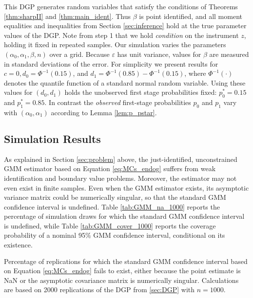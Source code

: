 This DGP generates random variables that satisfy the conditions of Theorems \ref{thm:sharpII} and \ref{thm:main_ident}.
Thus $\beta$ is point identified, and all moment equalities and inequalities from Section \ref{sec:inference} hold at the true parameter values of the DGP.
Note from step 1 that we hold \emph{condition} on the instrument $z$, holding it fixed in repeated samples.
Our simulation varies the parameters $(\alpha_0, \alpha_1, \beta, n)$ over a grid.
Because $\varepsilon$ has unit variance, values for $\beta$ are measured in standard deviations of the error.
For simplicity we present results for $c = 0, d_0 = \Phi^{-1}(0.15)$, and  $d_1= \Phi^{-1}(0.85) - \Phi^{-1}(0.15)$, where $\Phi^{-1}(\cdot)$ denotes the quantile function of a standard normal random variable.
Using these values for $(d_0, d_1)$ holds the unobserved first stage probabilities fixed: $p^*_0 = 0.15$ and $p^*_1 = 0.85$.
In contrast the \emph{observed} first-stage probabilities $p_0$ and $p_1$ vary with $(\alpha_0, \alpha_1)$ according to Lemma \ref{lem:p_pstar}.


\subsection{Simulation Results}

As explained in Section \ref{sec:problem} above, the just-identified, unconstrained GMM estimator based on Equation \ref{eq:MCs_endog} suffers from weak identification and boundary value problems.
Moreover, the estimator may not even exist in finite samples.
Even when the GMM estimator exists, its asymptotic variance matrix could be numerically singular, so that the standard GMM confidence interval is undefined.
Table \ref{tab:GMM_na_1000} reports the percentage of simulation draws for which the standard GMM confidence interval is undefined, while Table \ref{tab:GMM_cover_1000} reports the coverage probability of a nominal 95\% GMM confidence interval, conditional on its existence.

\begin{table}[htbp]
  \small
  \centering
  
  \caption{Percentage of replications for which the standard GMM confidence interval based on Equation \ref{eq:MCs_endog} fails to exist, either because the point estimate is NaN or the asymptotic covariance matrix is numerically singular. Calculations are based on  2000 replications of the DGP from \ref{sec:DGP} with $n = 1000$.} 
  \label{tab:GMM_na_1000}
\end{table}

